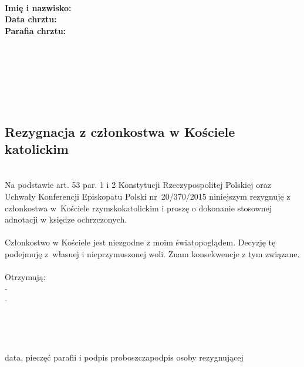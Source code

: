 \documentclass[12pt]{article}
\begin{document}
\thispagestyle{empty}

\begin{flushright}
\miejscowoscdata\\
\end{flushright}
~\\
~\\
\begin{flushleft}
\textbf{Imię i nazwisko:} \imie~\drugieimie~\nazwisko\\
\textbf{Data chrztu:} \datachrztu\\
\textbf{Parafia chrztu:} \parafiachrztu\\
~\\
~\\
\hspace{250pt}\parafiazamieszkania\\
\hspace{250pt}\parafiazamieszkaniaulicadom\\
\hspace{250pt}\parafiazamieszkaniakodmiasto\\
~\\
\end{flushleft}
\begin{center}
\section*{Rezygnacja z członkostwa w Kościele katolickim}
\end{center}


~\\
Na podstawie art. 53 par. 1 i 2 Konstytucji Rzeczypospolitej Polskiej oraz Uchwały Konferencji Episkopatu Polski nr~20/370/2015 niniejszym rezygnuję z członkostwa w~Kościele rzymskokatolickim i proszę o dokonanie stosownej adnotacji w księdze ochrzczonych.\\
~\\
Członkostwo w Kościele jest niezgodne z moim światopoglądem. Decyzję tę podejmuję z~własnej i nieprzymuszonej woli. Znam konsekwencje z tym związane.\\

~\\
Otrzymują:\\
- \parafiazamieszkania\\
- \imie~\drugieimie~\nazwisko
~\\
~\\
~\\
~\\
~\\
data, pieczęć parafii i podpis proboszcza\hspace{100pt}podpis osoby rezygnującej
\end{document}
